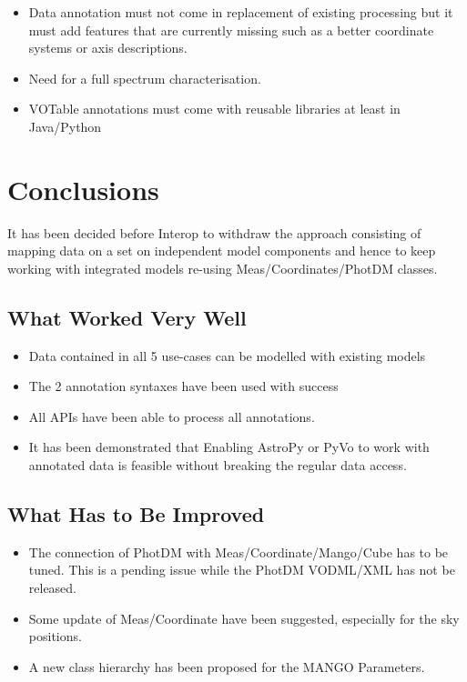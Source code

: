 \documentclass[11pt,a4paper]{ivoa}
\begin{document}
\begin{itemize}
\item Data annotation must not come in replacement of existing processing but it must 
         add features that are currently missing such as a better coordinate systems or axis descriptions.
\item Need for a full spectrum characterisation.
\item VOTable annotations must come with reusable libraries at least in Java/Python
\end{itemize}
 
 
 \section{Conclusions}
 
 It has been decided before Interop to withdraw the approach consisting of mapping data on a set on independent model components and hence to keep working with integrated models re-using Meas/Coordinates/PhotDM classes.
 
\subsection{What Worked Very Well}

\begin{itemize}
\item Data contained in all 5 use-cases can be modelled with existing models
\item The 2 annotation syntaxes have been used with success
\item All  APIs have been able to process all annotations.
\item  It has been demonstrated that Enabling AstroPy or PyVo to work with annotated data is feasible without breaking the regular data access.
\end{itemize}

\subsection{What Has to Be Improved}

\begin{itemize}
\item The connection of PhotDM with Meas/Coordinate/Mango/Cube has to be tuned. This is a pending issue while the PhotDM VODML/XML has not be released.
\item Some update of Meas/Coordinate have been suggested, especially for the sky positions.
\item A new class hierarchy has been proposed for the MANGO Parameters.
\end{itemize}
\end{document}
